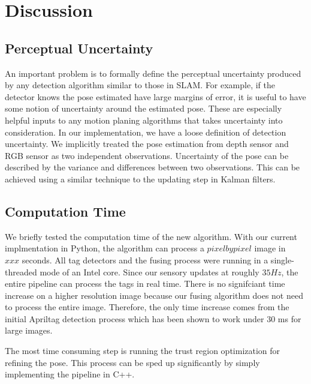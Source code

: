 \section{Discussion}
\label{sec:discussion}
\subsection{Perceptual Uncertainty}
An important problem is to formally define the perceptual uncertainty produced by any detection algorithm similar to those in SLAM. For example, if the detector knows the pose estimated have large margins of error, it is useful to have some notion of uncertainty around the estimated pose. These are especially helpful inputs to any motion planing algorithms that takes uncertainty into consideration. In our implementation, we have a loose definition of detection uncertainty. We implicitly treated the pose estimation from depth sensor and RGB sensor as two independent observations. Uncertainty of the pose can be described by the variance and differences between two observations. This can be achieved using a similar technique to the updating step in Kalman filters.

\subsection{Computation Time}
We briefly tested the computation time of the new algorithm. With our current implmentation in Python, the algorithm can process a $pixel by pixel$ image in ~$xxx$ seconds. All tag detectors and the fusing process were running in a single-threaded mode of an Intel core. Since our sensory updates at roughly $35Hz$, the entire pipeline can process the tags in real time. There is no signifciant time increase on a higher resolution image because our fusing algorithm does not need to process the entire image. Therefore, the only time increase comes from the initial Apriltag detection process which has been shown to work under $30$ ms for large images.

The most time consuming step is running the trust region optimization for refining the pose. This process can be sped up significantly by simply implementing the pipeline in C++.